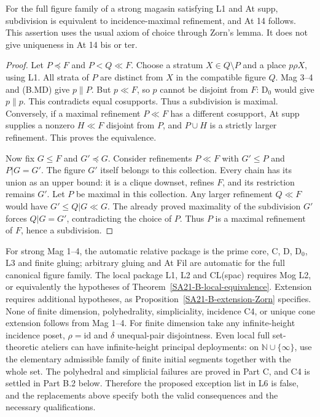 \begin{proposition}
\label{SA21-B-extension-Zorn}
For the full figure family of a strong magasin satisfying L1 and
At supp, subdivision is equivalent to incidence-maximal refinement,
and At 14 follows. This assertion uses the usual axiom of choice
through Zorn's lemma. It does not give uniqueness in At 14 bis or ter.
\end{proposition}

\begin{proof}
Let \(P\preceq F\) and \(P<Q\ll F\). Choose a stratum
\(X\in Q\setminus P\) and a place \(p\rho X\), using L1.
All strata of \(P\) are distinct from \(X\) in the compatible
figure \(Q\). Mag 3--4 and (B.MD) give \(p\parallel P\).
But \(p\ll F\), so \(p\) cannot be disjoint from \(F\): D\(_0\)
would give \(p\parallel p\). This contradicts equal cosupports.
Thus a subdivision is maximal. Conversely, if a maximal refinement
\(P\ll F\) has a different cosupport, At supp supplies a nonzero
\(H\ll F\) disjoint from \(P\), and \(P\cup H\) is a strictly
larger refinement. This proves the equivalence.

Now fix \(G\leq F\) and \(G'\preceq G\). Consider refinements
\(P\ll F\) with \(G'\leq P\) and \(P|G=G'\). The figure \(G'\)
itself belongs to this collection. Every chain has its union as
an upper bound: it is a clique downset, refines \(F\), and its
restriction remains \(G'\). Let \(P\) be maximal in this collection.
Any larger refinement \(Q\ll F\) would have
\(G'\leq Q|G\ll G\). The already proved maximality of the subdivision
\(G'\) forces \(Q|G=G'\), contradicting the choice of \(P\).
Thus \(P\) is a maximal refinement of \(F\), hence a subdivision.
\end{proof}

\begin{remark}
\label{SA21-B-L6-status}
For strong Mag 1--4, the automatic relative package is the prime core,
C, D, D\(_0\), L3 and finite gluing; arbitrary gluing and At Fil are
automatic for the full canonical figure family. The local package
L1, L2 and CL(spac) requires Mog L2, or equivalently the hypotheses
of Theorem~\ref{SA21-B-local-equivalence}. Extension requires additional
hypotheses, as Proposition~\ref{SA21-B-extension-Zorn} specifies.
None of finite dimension, polyhedrality, simpliciality, incidence C4,
or unique cone extension follows from Mag 1--4. For finite dimension
take any infinite-height incidence poset, \(\rho=\mathrm{id}\) and
\(\delta\) unequal-pair disjointness. Even local full set-theoretic
ateliers can have infinite-height principal deployments: on
\(\mathbb N\cup\{\infty\}\), use the elementary admissible family
of finite initial segments together with the whole set. The
polyhedral and simplicial failures are proved in Part C, and C4 is
settled in Part B.2 below. Therefore the proposed exception list in
L6 is false, and the replacements above specify both the valid
consequences and the necessary qualifications.
\end{remark}

